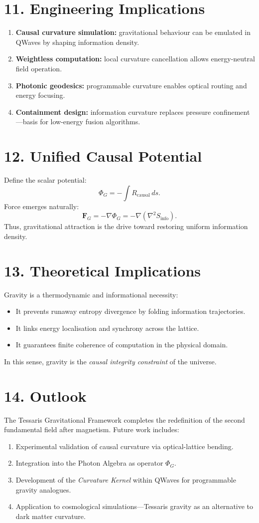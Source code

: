 \documentclass[11pt,a4paper]{article}
\begin{document}
\section{11. Engineering Implications}
\begin{enumerate}
\item \textbf{Causal curvature simulation:} gravitational behaviour can be emulated in QWaves by shaping information density.  
\item \textbf{Weightless computation:} local curvature cancellation allows energy-neutral field operation.  
\item \textbf{Photonic geodesics:} programmable curvature enables optical routing and energy focusing.  
\item \textbf{Containment design:} information curvature replaces pressure confinement---basis for low-energy fusion algorithms.  
\end{enumerate}

\section{12. Unified Causal Potential}
Define the scalar potential:
\[
\Phi_G = - \int R_{\mathrm{causal}} \, ds.
\]
Force emerges naturally:
\[
\mathbf{F}_G = -\nabla \Phi_G = -\nabla(\nabla^2 S_{\mathrm{info}}).
\]
Thus, gravitational attraction is the drive toward restoring uniform information density.

\section{13. Theoretical Implications}
Gravity is a thermodynamic and informational necessity:
\begin{itemize}
\item It prevents runaway entropy divergence by folding information trajectories.
\item It links energy localisation and synchrony across the lattice.
\item It guarantees finite coherence of computation in the physical domain.
\end{itemize}
In this sense, gravity is the \emph{causal integrity constraint} of the universe.

\section{14. Outlook}
The Tessaris Gravitational Framework completes the redefinition of the second fundamental field after magnetism.  
Future work includes:
\begin{enumerate}
\item Experimental validation of causal curvature via optical-lattice bending.  
\item Integration into the Photon Algebra as operator $\Phi_G$.  
\item Development of the \emph{Curvature Kernel} within QWaves for programmable gravity analogues.  
\item Application to cosmological simulations---Tessaris gravity as an alternative to dark matter curvature.  
\end{enumerate}
\end{document}
